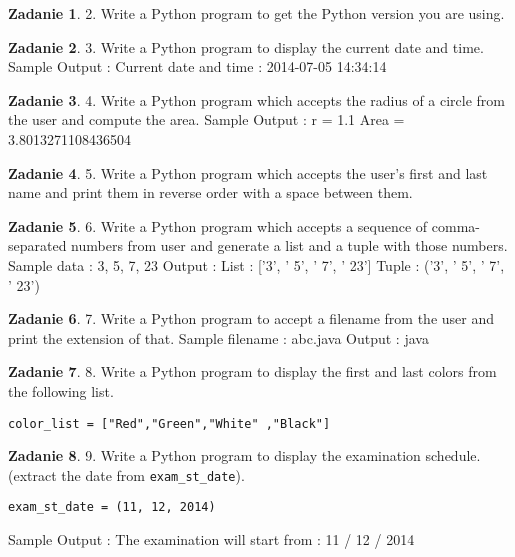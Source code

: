\documentclass[11pt]{article}
\theoremstyle{definition}
\newtheorem{zadanie}{Zadanie}
\begin{document}
\begin{zadanie}
2. Write a Python program to get the Python version you are using.
\end{zadanie}

\begin{zadanie}
3. Write a Python program to display the current date and time.
Sample Output :
Current date and time :
2014-07-05 14:34:14
\end{zadanie}

\begin{zadanie}
4. Write a Python program which accepts the radius of a circle from the user and compute the area.
Sample Output :
r = 1.1
Area = 3.8013271108436504
\end{zadanie}

\begin{zadanie}
5. Write a Python program which accepts the user's first and last name and print them in reverse order with a space between them.
\end{zadanie}

\begin{zadanie}
6. Write a Python program which accepts a sequence of comma-separated numbers from user and generate a list and a tuple with those numbers.
Sample data : 3, 5, 7, 23
Output :
List : ['3', ' 5', ' 7', ' 23']
Tuple : ('3', ' 5', ' 7', ' 23')
\end{zadanie}

\begin{zadanie}
7. Write a Python program to accept a filename from the user and print the extension of that.
Sample filename : abc.java
Output : java
\end{zadanie}

\begin{zadanie}
8. Write a Python program to display the first and last colors from the following list.
\begin{verbatim}
color_list = ["Red","Green","White" ,"Black"]
\end{verbatim}
\end{zadanie}

\begin{zadanie}
9. Write a Python program to display the examination schedule. (extract the date from \texttt{exam\_st\_date}).
\begin{verbatim}
exam_st_date = (11, 12, 2014)
\end{verbatim}
Sample Output : The examination will start from : 11 / 12 / 2014
\end{zadanie}
\end{document}
